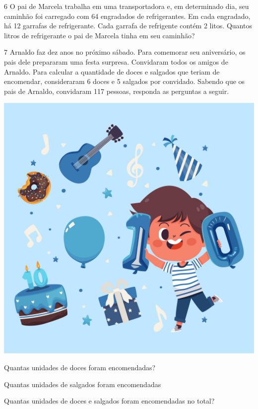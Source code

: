 \num{6} O pai de Marcela trabalha em uma transportadora e, em determinado
dia, seu caminhão foi carregado com 64 engradados de refrigerantes.
Em cada engradado, há 12 garrafas de refrigerante. Cada garrafa de refrigente
contém 2 litos. Quantos litros de refrigerante o pai de Marcela tinha em seu caminhão?


\num{7} Arnaldo faz dez anos no próximo sábado. Para comemorar seu 
aniversário, os pais dele prepararam uma festa surpresa.
Convidaram todos os amigos de Arnaldo. Para calcular a quantidade 
de doces e salgados que teriam de encomendar, consideraram 6 doces e 
5 salgados por convidado. Sabendo que os pais de Arnaldo,
convidaram 117 pessoas, responda as perguntas a seguir.

\begin{center}
\includegraphics[width=.5\textwidth]{media/image14d.jpeg}
\end{center}

\begin{escolha}
\item Quantas unidades de doces foram encomendadas?\\

\item Quantas unidades de salgados foram encomendadas\\

\item Quantas unidades de doces e salgados foram encomendadas no total?\\
\end{escolha}

